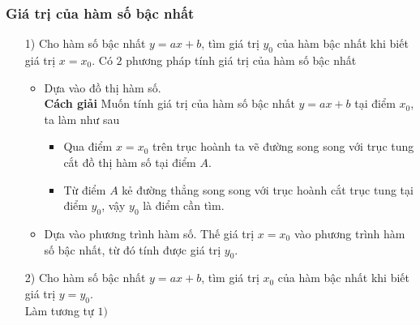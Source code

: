 \subsubsection{Giá trị của hàm số bậc nhất}
\begin{itemize}
	\item[1)] Cho hàm số bậc nhất $y=ax+b$, tìm giá trị $y_0$ của hàm bậc nhất khi biết giá trị $x=x_0$.
Có $2$ phương pháp tính giá trị của hàm số bậc nhất
\begin{itemize}
	\item Dựa vào đồ thị hàm số.\\
	\textbf{Cách giải} Muốn tính giá trị của hàm số bậc nhất $y=ax+b$ tại điểm $x_0$, ta làm như sau
	\begin{itemize}
		\item Qua điểm $x=x_0$ trên trục hoành ta vẽ đường song song với trục tung cắt đồ thị hàm số tại điểm $A$.
		\item Từ điểm $A$ kẻ đường thẳng song song với trục hoành cắt trục tung tại điểm $y_0$, vậy $y_0$ là điểm cần tìm.
	\end{itemize}
	\item Dựa vào phương trình hàm số. Thế giá trị $x=x_0$ vào phương trình hàm số bậc nhất, từ đó tính được giá trị $y_0$.
\end{itemize}
\item[2)] Cho hàm số bậc nhất $y=ax+b$, tìm giá trị $x_0$ của hàm bậc nhất khi biết giá trị $y=y_0$.\\
Làm tương tự $1)$
\end{itemize}
